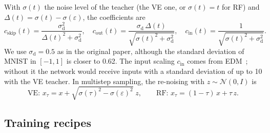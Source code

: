 \documentclass{article}
\begin{document}
With $\sigma(t)$ the noise level of the teacher (the VE one, or $\sigma(t) = t$ for
RF) and $\Delta(t) = \sigma(t) - \sigma(\varepsilon)$, the coefficients are
\begin{equation}
  c_\text{skip}(t) = \frac{\sigma_\text{d}^2}{\Delta(t)^2 + \sigma_\text{d}^2}, \quad
  c_\text{out}(t) = \frac{\sigma_\text{d}\,\Delta(t)}{\sqrt{\sigma(t)^2 + \sigma_\text{d}^2}}, \quad
  c_\text{in}(t) = \frac{1}{\sqrt{\sigma(t)^2 + \sigma_\text{d}^2}}.
\end{equation}
We use $\sigma_\text{d} = 0.5$ as in the original paper, although the standard
deviation of MNIST in $[-1, 1]$ is closer to 0.62. The input scaling $c_\text{in}$
comes from EDM~\cite{karras2022edm}; without it the network would receive inputs
with a standard deviation of up to 10 with the VE teacher. In multistep sampling,
the re-noising with $z \sim \mathcal{N}(0, I)$ is
\begin{equation}
  \text{VE: } x_\tau = x + \sqrt{\sigma(\tau)^2 - \sigma(\varepsilon)^2}\; z,
  \qquad
  \text{RF: } x_\tau = (1 - \tau)\, x + \tau\, z.
\end{equation}

\subsection{Training recipes}
\label{sec:app_recipes}
\end{document}
